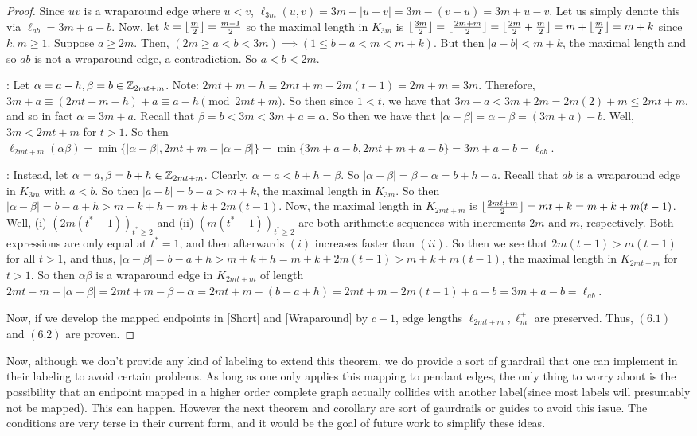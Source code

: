 \begin{proof}
Since $uv$ is a wraparound edge where $u<v$, $\ell_{3m}(u,v)=3m-|u-v|=3m-(v-u)=3m+u-v$. Let us simply denote this via $\ell_{ab}=3m+a-b$. Now, let $k=\lfloor\frac{m}{2}\rfloor=\frac{m-1}{2}$ so the maximal length in $K_{3m}$ is $\lfloor\frac{3m}{2}\rfloor=\lfloor\frac{2m+m}{2}\rfloor=\lfloor\frac{2m}{2}+\frac{m}{2}\rfloor=m+\lfloor\frac{m}{2}\rfloor=m+k$ since $k,m\geq 1$. Suppose $a\geq 2m$. Then, $(2m\geq a<b<3m)\implies (1\leq b-a<m<m+k).$ But then $|a-b|<m+k$, the maximal length and so $ab$ is not a wraparound edge, a contradiction. So $a<b<2m$.\newline

\noindent [Short]: Let $\alpha= a-h,\beta=b\in \mathbb{Z}_{2mt+m}$. Note: $2mt+m-h\equiv 2mt+m-2m(t-1)=2m+m=3m$. Therefore, $3m+a\equiv (2mt+m-h)+a\equiv a-h \pmod{2mt+m}$. So then since $1<t$, we have that $3m+a<3m+2m=2m(2)+m\leq 2mt+m$, and so in fact $\alpha = 3m+a$. Recall that $\beta=b<3m<3m+a=\alpha$. So then we have that $|\alpha-\beta|=\alpha-\beta=(3m+a)-b$. Well, $3m<2mt+m$ for $t>1$. So then $\ell_{2mt+m}(\alpha\beta)=\min\{|\alpha-\beta|,2mt+m-|\alpha-\beta|\}=\min\{3m+a-b, 2mt+m+a-b\}=3m+a-b=\ell_{ab}$.\newline

\noindent [Wraparound]: Instead, let $\alpha =a,\beta=b+h\in \mathbb{Z}_{2mt+m}$. Clearly, $\alpha=a<b+h=\beta$. So $|\alpha-\beta|=\beta-\alpha=b+h-a$. Recall that $ab$ is a wraparound edge in $K_{3m}$ with $a<b$. So then $|a-b|=b-a>m+k$, the maximal length in $K_{3m}$. So then $|\alpha-\beta|=b-a+h>m+k+h=m+k+2m(t-1)$. Now, the maximal length in $K_{2mt+m}$ is $\lfloor\frac{2mt+m}{2}\rfloor=mt+k=m+k+m(t-1)$. Well, (i) $(2m(t^{*}-1))_{t^{*}\geq 2}$ and (ii) $(m(t^{*}-1))_{t^{*}\geq 2}$ are both arithmetic sequences with increments $2m$ and $m$, respectively. Both expressions are only equal at $t^{*}=1$, and then afterwards $(i)$ increases faster than $(ii)$. So then we see that $2m(t-1)>m(t-1)$ for all $t>1$, and thus, $|\alpha-\beta|=b-a+h>m+k+h=m+k+2m(t-1)>m+k+m(t-1)$, the maximal length in $K_{2mt+m}$ for $t>1$. So then $\alpha\beta$ is a wraparound edge in $K_{2mt+m}$ of length $2mt-m-|\alpha-\beta|=2mt+m-\beta-\alpha=2mt+m - (b-a+h)= 2mt+m-2m(t-1)+a-b=3m+a-b=\ell_{ab}$.

Now, if we develop the mapped endpoints in [Short] and [Wraparound] by $c-1$, edge lengths $\ell_{2mt+m},\ell_{m}^{+}$ are preserved. Thus, $(6.1)$ and $(6.2)$ are proven.

\end{proof}
Now, although we don't provide any kind of labeling to extend this theorem, we do provide a sort of guardrail that one can implement in their labeling to avoid certain problems. As long as one only applies this mapping to pendant edges, the only thing to worry about is the possibility that an endpoint mapped in a higher order complete graph actually collides with another label(since most labels will presumably not be mapped). This can happen. However the next theorem and corollary are sort of gaurdrails or guides to avoid this issue. The conditions are very terse in their current form, and it would be the goal of future work to simplify these ideas.\newline
